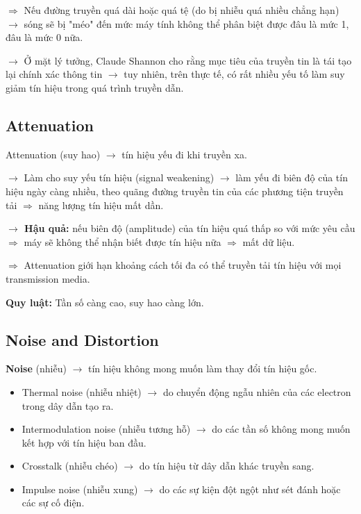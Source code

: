 \noindent
$\Rightarrow$ Nếu đường truyền quá dài hoặc quá tệ (do bị nhiễu quá nhiều chẳng hạn) $\rightarrow$ sóng sẽ bị "méo" đến mức máy tính không thể phân biệt được đâu là mức 1, đâu là mức 0 nữa.
\medskip

\noindent
$\rightarrow$ Ở mặt lý tưởng, Claude Shannon cho rằng mục tiêu của truyền tin là tái tạo lại chính xác thông tin $\rightarrow$ tuy nhiên, trên thực tế, có rất nhiều yếu tố làm suy giảm tín hiệu trong quá trình truyền dẫn.
\medskip

\subsection{Attenuation}

\noindent
Attenuation (suy hao) $\rightarrow$ tín hiệu yếu đi khi truyền xa.

$\rightarrow$ Làm cho suy yếu tín hiệu (signal weakening) $\rightarrow$ làm yếu đi biên độ của tín hiệu ngày càng nhiều, theo quãng đường truyền tin của các phương tiện truyền tải $\Rightarrow$ năng lượng tín hiệu mất dần.
\medskip

\noindent
\textbf{$\rightarrow$ Hậu quả:} nếu biên độ (amplitude) của tín hiệu quá thấp so với mức yêu cầu $\Rightarrow$ máy sẽ không thể nhận biết được tín hiệu nữa $\Rightarrow$ mất dữ liệu.

$\Rightarrow$ Attenuation giới hạn khoảng cách tối đa có thể truyền tải tín hiệu với mọi transmission media.
\medskip

\noindent
\textbf{Quy luật:} Tần số càng cao, suy hao càng lớn.
\medskip


\subsection{Noise and Distortion}

\noindent
\textbf{Noise} (nhiễu) $\rightarrow$ tín hiệu không mong muốn làm thay đổi tín hiệu gốc.

\begin{itemize}
    \item Thermal noise (nhiễu nhiệt) $\rightarrow$ do chuyển động ngẫu nhiên của các electron trong dây dẫn tạo ra.
    \item Intermodulation noise (nhiễu tương hỗ) $\rightarrow$ do các tần số không mong muốn kết hợp với tín hiệu ban đầu.
    \item Crosstalk (nhiễu chéo) $\rightarrow$ do tín hiệu từ dây dẫn khác truyền sang.
    \item Impulse noise (nhiễu xung) $\rightarrow$ do các sự kiện đột ngột như sét đánh hoặc các sự cố điện.
\end{itemize}
\medskip

